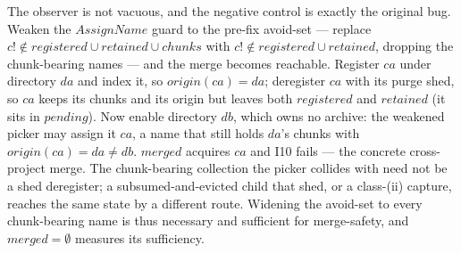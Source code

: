 \documentclass[a4paper]{article}
\begin{document}
The observer is not vacuous, and the negative control is exactly the original
bug.  Weaken the $AssignName$ guard to the pre-fix avoid-set --- replace $c!
\notin registered \cup retained \cup chunks$ with $c! \notin registered \cup
retained$, dropping the chunk-bearing names --- and the merge becomes reachable.
Register $ca$ under directory $da$ and index it, so $origin(ca) = da$; deregister
$ca$ with its purge shed, so $ca$ keeps its chunks and its origin but leaves both
$registered$ and $retained$ (it sits in $pending$).  Now enable directory $db$,
which owns no archive: the weakened picker may assign it $ca$, a name that still
holds $da$'s chunks with $origin(ca) = da \neq db$.  $merged$ acquires $ca$ and
I10 fails --- the concrete cross-project merge.  The chunk-bearing collection the
picker collides with need not be a shed deregister; a subsumed-and-evicted child
that shed, or a class-(ii) capture, reaches the same state by a different route.
Widening the avoid-set to every chunk-bearing name is thus necessary and
sufficient for merge-safety, and $merged = \emptyset$ measures its sufficiency.
\end{document}

